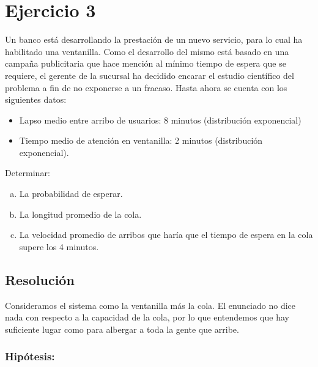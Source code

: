 \documentclass[a4paper,11pt]{article}
\begin{document}
\vspace{35pt}
\section{\textbf{Ejercicio 3}}

Un banco está desarrollando la prestación de un nuevo servicio, para lo cual ha
habilitado una ventanilla. Como el desarrollo del mismo está basado en una
campaña publicitaria que hace mención al mínimo tiempo de espera que se
requiere, el gerente de la sucursal ha decidido encarar el estudio científico
del problema a fin de no exponerse a un fracaso. Hasta ahora se cuenta con los
siguientes datos:

\leftskip=36pt
\parindent=-18pt
\begin{itemize}
  \item Lapso medio entre arribo de usuarios: 8 minutos (distribución
    exponencial)
  \item Tiempo medio de atención en ventanilla: 2 minutos (distribución
    exponencial).
\end{itemize}

\leftskip=0pt
\parindent=0pt
Determinar:

\leftskip=36pt
\parindent=-18pt
\begin{enumerate}[a)]
  \item La probabilidad de esperar.
  \item La longitud promedio de la cola.
  \item La velocidad promedio de arribos que haría que el tiempo de espera en
    la cola supere los 4 minutos.
\end{enumerate}

\vspace{13pt}
\leftskip=0pt
\parindent=0pt
\subsection{\textbf{Resolución}}

Consideramos el sistema como la ventanilla más la cola. El enunciado no dice
nada con respecto a la capacidad de la cola, por lo que entendemos que hay
suficiente lugar como para albergar a toda la gente que arribe.

\vspace{5pt}
\subsubsection*{Hipótesis:}
\end{document}
